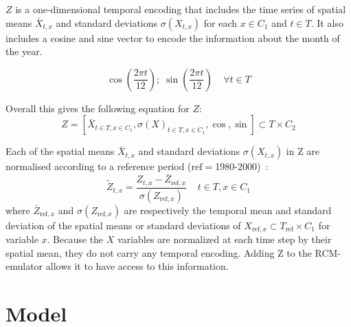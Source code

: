 \documentclass[a4paper,11pt,oneside]{report}
\begin{document}
$Z$ is a one-dimensional temporal encoding that includes the time series of spatial means $\bar{X}_{t,x}$ and standard deviations $\sigma(X_{t,x})$ for each $x\in C_1$ and $t\in T$. It also includes a cosine and sine vector to encode the information about the month of the year. 

\begin{equation}
       \cos\left(\frac{2\pi t}{12}\right);\; \sin\left(\frac{2\pi t}{12}\right) \;\;\;\; \forall t\in T
\end{equation}

Overall this gives the following equation for $Z$:
\begin{equation}\label{eq:Z}
    Z = \left[ \bar{X}_{t\in T, x\in C_1}, \sigma\left(X\right)_{t\in T, x\in C_1}, \cos, \sin \right] \subset T \times C_2
\end{equation}

Each of the spatial means $\bar{X}_{t,x}$ and standard deviations $\sigma(X_{t,x})$ in Z are normalised according to a reference period ($\mathrm{ref}=$1980-2000)~\cite{Doury}:
\begin{equation}\label{eq:normalisation-Z}
    \tilde{Z}_{t,x} = \frac{Z_{t,x}-\bar{Z}_{\mathrm{\mathrm{ref}},x}}{\sigma(Z_{\mathrm{ref},x})} \;\;\;\; t\in T, x\in C_1
\end{equation}
where $\bar{Z}_{\mathrm{ref},x}$ and $\sigma(Z_{\mathrm{ref},x})$ are respectively the temporal mean and standard deviation of the spatial means or standard deviations of $X_{\mathrm{ref}, x} \subset T_{\mathrm{ref}}\times C_1$ for variable $x$. Because the $X$ variables are normalized at each time step by their spatial mean, they do not carry any temporal encoding. Adding Z to the RCM-emulator allows it to have access to this information. 



\section{Model}\label{sec:model}
\end{document}

